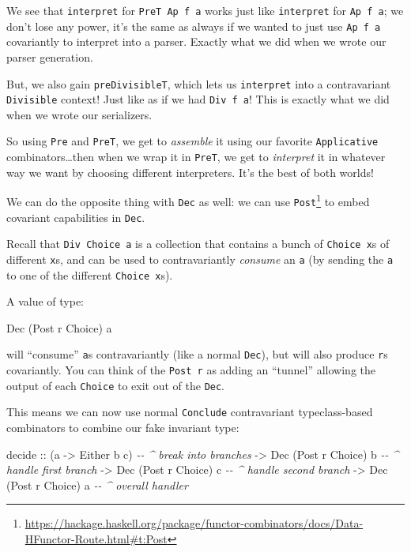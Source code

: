 \documentclass[]{article}
\newenvironment{Shaded}{}{}
\newcommand{\CommentTok}[1]{\textcolor[rgb]{0.38,0.63,0.69}{\textit{#1}}}
\newcommand{\DataTypeTok}[1]{\textcolor[rgb]{0.56,0.13,0.00}{#1}}
\newcommand{\NormalTok}[1]{#1}
\newcommand{\OtherTok}[1]{\textcolor[rgb]{0.00,0.44,0.13}{#1}}
\renewcommand{\href}[2]{#2\footnote{\url{#1}}}
\begin{document}
We see that \texttt{interpret} for \texttt{PreT\ Ap\ f\ a} works just like
\texttt{interpret} for \texttt{Ap\ f\ a}; we don't lose any power, it's the same
as always if we wanted to just use \texttt{Ap\ f\ a} covariantly to interpret
into a parser. Exactly what we did when we wrote our parser generation.

But, we also gain \texttt{preDivisibleT}, which lets us \texttt{interpret} into
a contravariant \texttt{Divisible} context! Just like as if we had
\texttt{Div\ f\ a}! This is exactly what we did when we wrote our serializers.

So using \texttt{Pre} and \texttt{PreT}, we get to \emph{assemble} it using our
favorite \texttt{Applicative} combinators\ldots then when we wrap it in
\texttt{PreT}, we get to \emph{interpret} it in whatever way we want by choosing
different interpreters. It's the best of both worlds!

We can do the opposite thing with \texttt{Dec} as well: we can use
\href{https://hackage.haskell.org/package/functor-combinators/docs/Data-HFunctor-Route.html\#t:Post}{\texttt{Post}}
to embed covariant capabilities in \texttt{Dec}.

Recall that \texttt{Div\ Choice\ a} is a collection that contains a bunch of
\texttt{Choice\ x}s of different \texttt{x}s, and can be used to contravariantly
\emph{consume} an \texttt{a} (by sending the \texttt{a} to one of the different
\texttt{Choice\ x}s).

A value of type:

\begin{Shaded}
\begin{Highlighting}[]
\DataTypeTok{Dec}\NormalTok{ (}\DataTypeTok{Post}\NormalTok{ r }\DataTypeTok{Choice}\NormalTok{) a}
\end{Highlighting}
\end{Shaded}

will ``consume'' \texttt{a}s contravariantly (like a normal \texttt{Dec}), but
will also produce \texttt{r}s covariantly. You can think of the \texttt{Post\ r}
as adding an ``tunnel'' allowing the output of each \texttt{Choice} to exit out
of the \texttt{Dec}.

This means we can now use normal \texttt{Conclude} contravariant typeclass-based
combinators to combine our fake invariant type:

\begin{Shaded}
\begin{Highlighting}[]
\NormalTok{decide}
\OtherTok{    ::}\NormalTok{ (a }\OtherTok{{-}\textgreater{}} \DataTypeTok{Either}\NormalTok{ b c)        }\CommentTok{{-}{-} \^{} break into branches}
    \OtherTok{{-}\textgreater{}} \DataTypeTok{Dec}\NormalTok{ (}\DataTypeTok{Post}\NormalTok{ r }\DataTypeTok{Choice}\NormalTok{) b    }\CommentTok{{-}{-} \^{} handle first branch}
    \OtherTok{{-}\textgreater{}} \DataTypeTok{Dec}\NormalTok{ (}\DataTypeTok{Post}\NormalTok{ r }\DataTypeTok{Choice}\NormalTok{) c    }\CommentTok{{-}{-} \^{} handle second branch}
    \OtherTok{{-}\textgreater{}} \DataTypeTok{Dec}\NormalTok{ (}\DataTypeTok{Post}\NormalTok{ r }\DataTypeTok{Choice}\NormalTok{) a    }\CommentTok{{-}{-} \^{} overall handler}
\end{Highlighting}
\end{Shaded}
\end{document}

